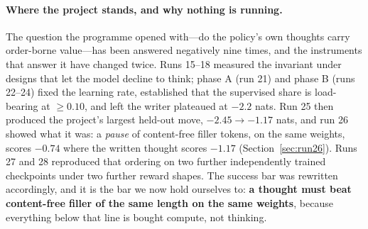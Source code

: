 \documentclass{article} %
\begin{document}
\paragraph{Where the project stands, and why nothing is running.} The question the programme opened with---do the policy's own thoughts carry order-borne value---has been answered negatively nine times, and the instruments that answer it have changed twice. Runs 15--18 measured the invariant under designs that let the model decline to think; phase A (run 21) and phase B (runs 22--24) fixed the learning rate, established that the supervised share is load-bearing at $\ge 0.10$, and left the writer plateaued at $-2.2$ nats. Run 25 then produced the project's largest held-out move, $-2.45 \to -1.17$ nats, and run 26 showed what it was: a \emph{pause} of content-free filler tokens, on the same weights, scores $-0.74$ where the written thought scores $-1.17$ (Section~\ref{sec:run26}). Runs 27 and 28 reproduced that ordering on two further independently trained checkpoints under two further reward shapes. The success bar was rewritten accordingly, and it is the bar we now hold ourselves to: \textbf{a thought must beat content-free filler of the same length on the same weights}, because everything below that line is bought compute, not thinking.
\end{document}
